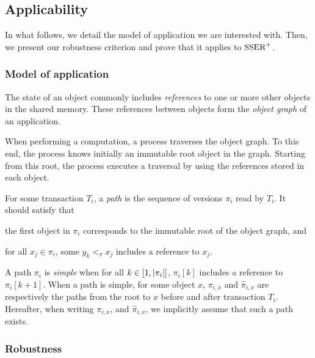 \subsection{Applicability}

In what follows, we detail the model of application we are interested with.
Then, we present our robustness criterion and prove that it applies to $\SPSER$.

\subsubsection{Model of application}

The state of an object commonly includes \emph{references} to one or more other objects in the shared memory.
These references between objects form the \emph{object graph} of an application.

When performing a computation, a process traverses the object graph.
To this end, the process knows initially an immutable root object in the graph.
Starting from this root, the process executes a traversal by using the references stored in each object.

For some transaction $T_i$, a \emph{path} is the sequence of versions $\pi_i$ read by $T_i$.
It should satisfy that 
\begin{inparaenum}
\item the first object in $\pi_i$ corresponds to the immutable root of the object graph, and
\item for all $x_j \in \pi_i$, some $y_k <_{\pi} x_j$ includes a reference to $x_j$.
\end{inparaenum}

A path $\pi_i$ is \emph{simple} when for all $k \in [1,\cardinalOf{\pi_i}]$, $\pi_i[k]$ includes a reference to $\pi_i[k+1]$.
When a path is simple, for some object $x$, $\pi_{i,x}$ and $\hat{\pi}_{i,x}$ are respectively the paths from the root to $x$ before and after transaction $T_i$.
Hereafter, when writing $\pi_{i,x}$, and $\hat{\pi}_{i,x}$, we implicitly assume that such a path exists.

\subsubsection{Robustness}

